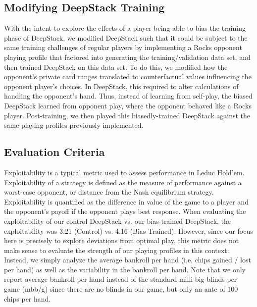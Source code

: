 \documentclass{article}
\begin{document}
\subsection{Modifying DeepStack Training}
With the intent to explore the effects of a player being able to bias the training phase of DeepStack, we modified DeepStack such that it could be subject to the same training challenges of regular players by implementing a Rocks opponent playing profile that factored into generating the training/validation data set, and then trained DeepStack on this data set. To do this, we modified how the opponent’s private card ranges translated to counterfactual values influencing the opponent player’s choices. In DeepStack, this required %
to alter calculations of handling the opponent’s hand. Thus, instead of learning from self-play, the biased DeepStack learned from opponent play, where the opponent behaved like a Rocks player. Post-training, we then played this biasedly-trained DeepStack against the same playing profiles previously implemented. 

\subsection{Evaluation Criteria}
Exploitability is a typical metric used to assess performance in Leduc Hold'em. Exploitability of a strategy is defined as the measure of performance against a worst-case opponent, or distance from the Nash equilibrium strategy. Exploitability is quantified as the difference in value of the game to a player and the opponent’s payoff if the opponent plays best response. When evaluating the exploitability of our control DeepStack vs. our bias-trained DeepStack, the exploitability was 3.21 (Control) vs. 4.16 (Bias Trained). However, since our focus here is precisely to explore deviations from optimal play, this metric does not make sense to evaluate the strength of our playing profiles in this context. Instead, we simply analyze the average bankroll per hand (i.e. chips gained / lost per hand) as well as the variability in the bankroll per hand. Note that we only report average bankroll per hand instead of the standard milli-big-blinds per game (mbb/g) since there are no blinds in our game, but only an ante of 100 chips per hand. %
\end{document}
